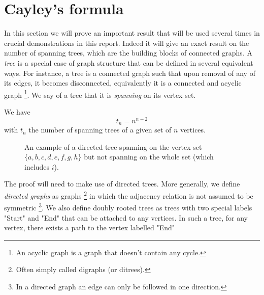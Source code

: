 \section{Cayley's formula}
In this section we will prove an important result that will be used several times in crucial demonstrations in this report. 
Indeed it will give an exact result on the number of spanning trees, which are the building blocks of connected graphs. 
A \emph{tree} is a special case of graph structure that can be defined in several equivalent ways. 
For instance, a tree is a connected graph such that upon removal of any of its edges, it becomes disconnected, equivalently it is a connected and acyclic graph
\footnote{An acyclic graph is a graph that doesn't contain any cycle.}.
We say of a tree that it is \emph{spanning} on its vertex set.
\begin{theorem}\label{cayley}
	We have
\begin{equation}
    t_n = n^{n-2}
\end{equation}
with $t_n$ the number of spanning trees of a given set of $n$ vertices.
\end{theorem}
\begin{figure}[h]
	\centering
	\caption{An example of a directed tree spanning on the vertex set $\{a,b,c,d,e,f,g,h\}$ but not spanning on the whole set (which includes $i$).}
\end{figure}	
The proof will need to make use of directed trees.
More generally, we define \emph{directed graphs} as graphs \footnote{Often simply called digraphs (or ditrees).} in which the adjacency relation is not assumed to be symmetric
\footnote{In a directed graph an edge can only be followed in one direction.}.
We also define doubly rooted trees as trees with two special labels "Start" and "End" that can be attached to any vertices.
In such a tree, for any vertex, there exists a path to the vertex labelled "End"
